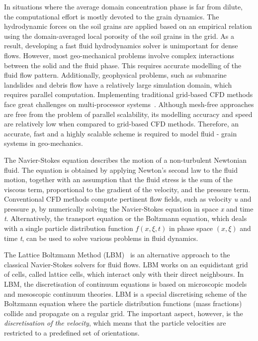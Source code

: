 In situations where the average domain concentration phase is far from dilute, 
the computational effort is mostly devoted to the grain dynamics. The 
hydrodynamic forces on the soil grains are applied based on an empirical 
relation using the domain-averaged local porosity of the soil grains in the 
grid. As a result, developing a fast fluid hydrodynamics solver is unimportant 
for dense flows. However, most geo-mechanical problems involve complex 
interactions between the solid and the fluid phase. This requires accurate 
modelling of the fluid flow pattern. Additionally, geophysical problems, such 
as submarine landslides and debris flow have a relatively large simulation 
domain, which requires parallel computation. Implementing traditional 
grid-based CFD methods face great challenges on multi-processor 
systems~\citep{Xiong2014}. Although mesh-free approaches are free from the 
problem of parallel scalability, its modelling accuracy and speed are 
relatively low when compared to grid-based CFD methods. Therefore, an accurate, 
fast and a highly scalable scheme is required to model fluid - grain systems in 
geo-mechanics. 
 
The Navier-Stokes equation describes the motion of a non-turbulent Newtonian 
fluid. The equation is obtained by applying Newton's second law to the fluid 
motion, together with an assumption that the fluid stress is the sum of the 
viscous term, proportional to the gradient of the velocity, and the pressure 
term. Conventional CFD methods compute pertinent flow fields, such as velocity 
\textit{u} and pressure \textit{p}, by numerically solving the Navier-Stokes 
equation in space \textit{x} and time \textit{t}. Alternatively, the transport 
equation or the Boltzmann equation, which deals with a single particle 
distribution function $f(x,\xi,t)$ in phase space $(x,\xi)$ and time 
\textit{t}, can be used to solve various problems in fluid dynamics. 

The Lattice Boltzmann Method
(LBM)~\citep{He1997a,He1997b,Chen1998a,Mei2000,Han2007a,Zhou2012}
is an alternative approach to the classical Navier-Stokes solvers for fluid 
flows. LBM works on an equidistant grid of cells, called lattice cells, which 
interact only with their direct neighbours. In LBM, the discretisation of 
continuum equations is based on microscopic models and mesoscopic continuum 
theories. LBM is a special discretising scheme of the Boltzmann equation where 
the particle distribution functions (mass fractions) collide and propagate on a 
regular grid. The important aspect, however, is the \textit{discretisation of 
the velocity}, which means that the particle velocities are restricted to a 
predefined set of orientations.


